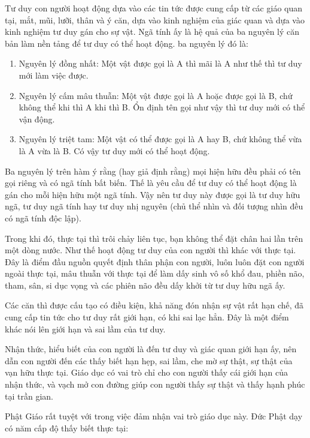 Tư duy con người hoạt động dựa vào các tin tức được cung cấp từ các giáo quan tại, mắt, mũi, lưỡi, thân và ý căn, dựa vào kinh nghiệm của giác quan và dựa vào kinh nghiệm tư duy gán cho sự vật. Ngã tính ấy là hệ quả của ba nguyên lý căn bản làm nền tảng để tư duy có thể hoạt động. ba nguyên lý đó là:

\begin{enumerate}[label=\itshape\alph*\upshape/]
    \item Nguyên lý đồng nhất: Một vật được gọi là A thì mãi là A như thế thì tư duy mới làm việc được.

    \item Nguyên lý cấm mâu thuẫn: Một vật được gọi là A hoặc được gọi là B, chứ không thể khi thì A khi thì B. Ổn định tên gọi như vậy thì tư duy mới có thể vận động.

    \item Nguyên lý triệt tam: Một vật có thể được gọi là A hay B, chứ không thể vừa là A vừa là B. Có vậy tư duy mới có thể hoạt động.
\end{enumerate}

Ba nguyên lý trên hàm ý rằng (hay giả định rằng) mọi hiện hữu đều phải có tên gọi riêng và có ngã tính bất biến. Thế là yêu cầu để tư duy có thể hoạt động là gán cho mỗi hiện hữu một ngã tính. Vậy nên tư duy này được gọi là tư duy hữu ngã, tư duy ngã tính hay tư duy nhị nguyên (chủ thể nhìn và đối tượng nhìn đều có ngã tính độc lập).

Trong khi đó, thực tại thì trôi chảy liên tục, bạn không thể đặt chân hai lần trên một dòng nước. Như thế hoạt động tư duy của con người thì khác với thực tại. Đây là điểm đầu nguồn quyết định thân phận con người, luôn luôn đặt con người ngoài thực tại, mâu thuẫn với thực tại để làm dấy sinh vô số khổ đau, phiền não, tham, sân, si dục vọng và các phiên não đều dấy khởi từ tư duy hữu ngã ấy.

Các căn thì được cấu tạo có điều kiện, khả năng đón nhận sự vật rất hạn chế, đã cung cấp tin tức cho tư duy rất giới hạn, có khi sai lạc hẳn. Đây là một điểm khác nói lên giới hạn và sai lầm của tư duy.

Nhận thức, hiểu biết của con người là đến tư duy và giác quan giới hạn ấy, nên dẫn con người đến các thấy biết hạn hẹp, sai lầm, che mờ sự thật, sự thật của vạn hữu thực tại. Giáo dục có vai trò chỉ cho con người thấy cái giới hạn của nhận thức, và vạch mở con đường giúp con người thấy sự thật và thấy hạnh phúc tại trần gian.

Phật Giáo rất tuyệt với trong việc đảm nhận vai trò giáo dục này. Đức Phật dạy có năm cấp độ thấy biết thực tại:

